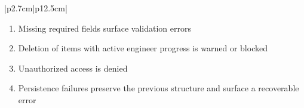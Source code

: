 \begin{table}[H]
\begin{tabular}{|p{2.7cm}|p{12.5cm}|}
\begin{minipage}[t]{\linewidth}
            \begin{enumerate}[topsep=0pt,itemsep=1pt,parsep=0pt,partopsep=0pt]
                \item Missing required fields surface validation errors
                \item Deletion of items with active engineer progress is warned or blocked
                \item Unauthorized access is denied
                \item Persistence failures preserve the previous structure and surface a recoverable error
            \end{enumerate}
        \end{minipage} \\
        \hline
    \end{tabular}
    \label{tab:teacher-modules-units}
\end{table}
